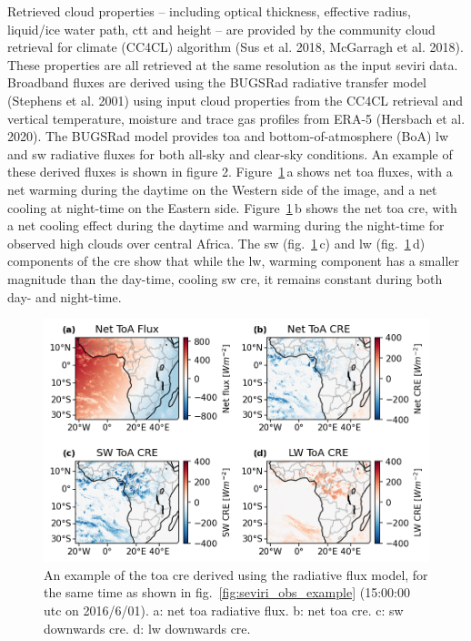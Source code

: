 Retrieved cloud properties -- including optical thickness, effective
radius, liquid/ice water path, \acrshort{ctt} and height -- are
provided by the community cloud retrieval for climate (CC4CL) algorithm
(Sus et al. 2018, McGarragh et al. 2018). These properties are all
retrieved at the same resolution as the input \acrshort{seviri} data. Broadband
fluxes are derived using the BUGSRad radiative transfer model (Stephens
et al. 2001) using input cloud properties from the CC4CL retrieval and
vertical temperature, moisture and trace gas profiles from ERA-5
(Hersbach et al. 2020). The BUGSRad model provides \acrshort{toa} and bottom-of-atmosphere (BoA) \acrshort{lw} and \acrshort{sw} radiative fluxes for both
all-sky and clear-sky conditions. An example of these derived fluxes is
shown in figure 2. 
Figure~\ref{fig:seviri_flux_example}\,a shows net \acrshort{toa} fluxes, with a net warming during the daytime on the Western side of the image, and a net cooling at night-time on the Eastern side. 
Figure~\ref{fig:seviri_flux_example}\,b shows the net \acrshort{toa} \acrshort{cre}, with a net cooling effect during the daytime and warming during the night-time for observed high clouds over central Africa. The \acrshort{sw} (fig.~\ref{fig:seviri_flux_example}\,c) and \acrshort{lw} (fig.~\ref{fig:seviri_flux_example}\,d) components of the \acrshort{cre} show that while the \acrshort{lw},
warming component has a smaller magnitude than the day-time, cooling \acrshort{sw} \acrshort{cre}, it remains constant during both day- and night-time.


\begin{figure}[tp]
    \includegraphics[width=\textwidth]{figures/ch3_02.png}
    \caption[
    An example of the \acrshort{toa} \acrshort{cre} derived using the radiative flux model
    ]{
    An example of the \acrshort{toa} \acrshort{cre} derived using the radiative flux model, for the same time
    as shown in fig.~\ref{fig:seviri_obs_example} (15:00:00 \acrshort{utc} on 2016/6/01). a: net \acrshort{toa} radiative flux. b: net \acrshort{toa} \acrshort{cre}. c: \acrshort{sw} downwards \acrshort{cre}. d: \acrshort{lw} downwards \acrshort{cre}.
    }
    \label{fig:seviri_flux_example}
\end{figure}


